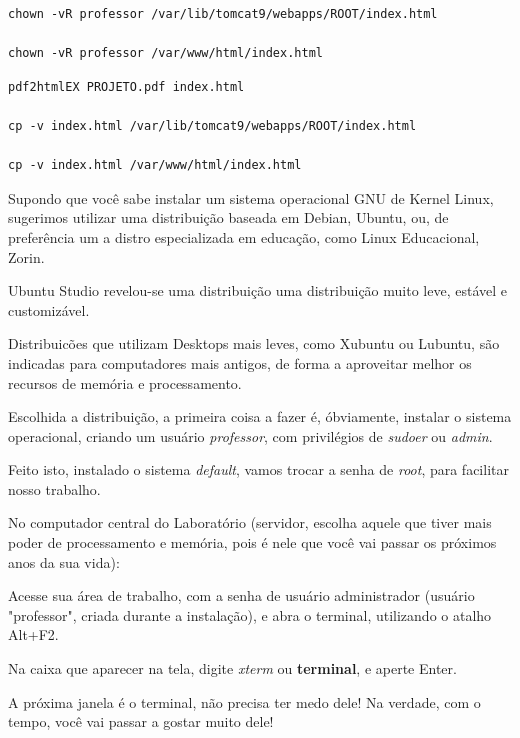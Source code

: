 \begin{multicols}{2}
\begin{lstlisting}
chown -vR professor /var/lib/tomcat9/webapps/ROOT/index.html
		
chown -vR professor /var/www/html/index.html
	\end{lstlisting}
	
	\begin{lstlisting}
pdf2htmlEX PROJETO.pdf index.html
		
cp -v index.html /var/lib/tomcat9/webapps/ROOT/index.html
		
cp -v index.html /var/www/html/index.html
	\end{lstlisting}
	
\end{multicols}





\begin{multicols}{2}
	\normalsize
	
	Supondo que você sabe instalar um sistema operacional GNU de Kernel Linux, sugerimos utilizar uma distribuição baseada em Debian, Ubuntu, ou, de preferência um a distro especializada em educação, como Linux Educacional, Zorin.
	
	Ubuntu Studio revelou-se uma distribuição uma distribuição muito leve, estável e customizável.
	
	Distribuicões que utilizam Desktops mais leves, como Xubuntu ou Lubuntu, são indicadas para computadores mais antigos, de forma a aproveitar melhor os recursos de memória e processamento.
	
	Escolhida a distribuição, a primeira coisa a fazer é, óbviamente, instalar o sistema operacional, criando um usuário \textit{professor}, com privilégios de \textit{sudoer} ou \textit{admin}.
	
	Feito isto, instalado o sistema \textit{default}, vamos trocar a senha de \textit{root}, para facilitar nosso trabalho.
	
	No computador central do Laboratório (servidor, escolha aquele que tiver mais poder de processamento e memória, pois é nele que você vai passar os próximos anos da sua vida):
	
	Acesse sua área de trabalho, com a senha de usuário administrador (usuário "professor", criada durante a instalação), e abra o terminal, utilizando o atalho Alt+F2.
	
	Na caixa que aparecer na tela, digite \textit{xterm} ou \textbf{terminal}, e aperte Enter.
	
	A próxima janela é o terminal, não precisa ter medo dele! Na verdade, com o tempo, você vai passar a gostar muito dele!
	

\end{multicols}
